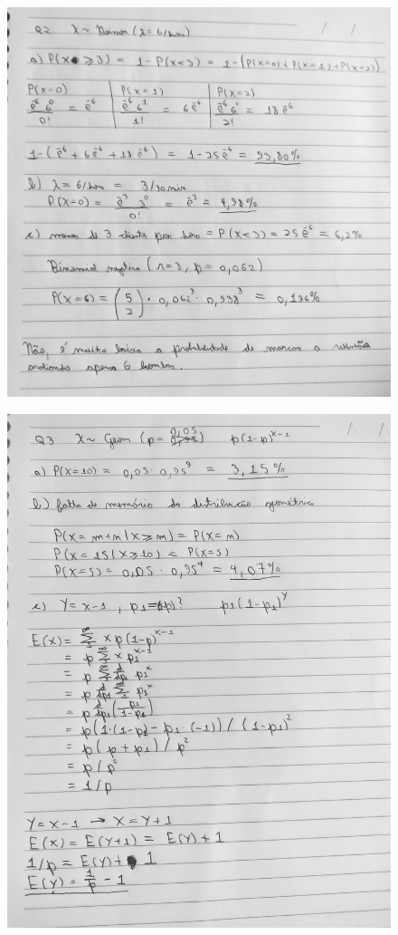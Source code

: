 \documentclass[12pt]{article}
\begin{document}
	\begin{figure}[h!]
		\includegraphics[scale=0.2]{q2}
	\end{figure}

	\begin{figure}[h!]
		\includegraphics[scale=0.2]{q3}
	\end{figure}
\end{document}
